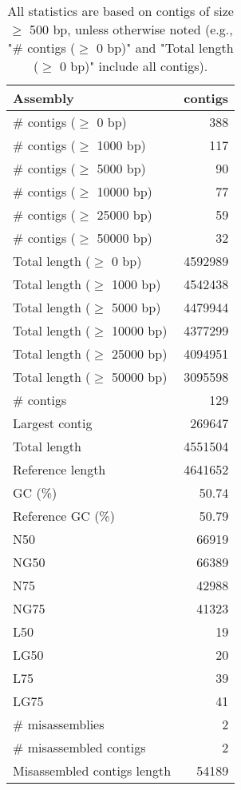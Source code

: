 \documentclass[12pt,a4paper]{article}
\begin{document}
\begin{table}[ht]
\begin{center}
\caption{All statistics are based on contigs of size $\geq$ 500 bp, unless otherwise noted (e.g., "\# contigs ($\geq$ 0 bp)" and "Total length ($\geq$ 0 bp)" include all contigs).}
\begin{tabular}{|l*{1}{|r}|}
\hline
Assembly & contigs \\ \hline
\# contigs ($\geq$ 0 bp) & 388 \\ \hline
\# contigs ($\geq$ 1000 bp) & 117 \\ \hline
\# contigs ($\geq$ 5000 bp) & 90 \\ \hline
\# contigs ($\geq$ 10000 bp) & 77 \\ \hline
\# contigs ($\geq$ 25000 bp) & 59 \\ \hline
\# contigs ($\geq$ 50000 bp) & 32 \\ \hline
Total length ($\geq$ 0 bp) & 4592989 \\ \hline
Total length ($\geq$ 1000 bp) & 4542438 \\ \hline
Total length ($\geq$ 5000 bp) & 4479944 \\ \hline
Total length ($\geq$ 10000 bp) & 4377299 \\ \hline
Total length ($\geq$ 25000 bp) & 4094951 \\ \hline
Total length ($\geq$ 50000 bp) & 3095598 \\ \hline
\# contigs & 129 \\ \hline
Largest contig & 269647 \\ \hline
Total length & 4551504 \\ \hline
Reference length & 4641652 \\ \hline
GC (\%) & 50.74 \\ \hline
Reference GC (\%) & 50.79 \\ \hline
N50 & 66919 \\ \hline
NG50 & 66389 \\ \hline
N75 & 42988 \\ \hline
NG75 & 41323 \\ \hline
L50 & 19 \\ \hline
LG50 & 20 \\ \hline
L75 & 39 \\ \hline
LG75 & 41 \\ \hline
\# misassemblies & 2 \\ \hline
\# misassembled contigs & 2 \\ \hline
Misassembled contigs length & 54189 \\ \hline

\end{tabular}
\end{center}
\end{table}
\end{document}
